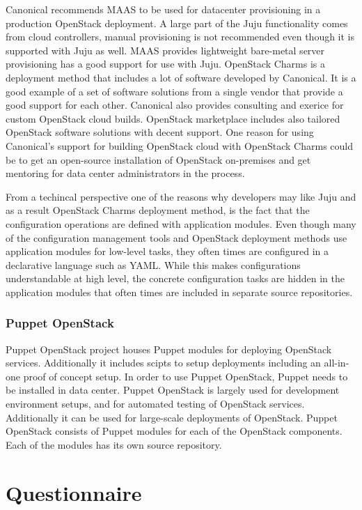 Canonical recommends MAAS to be used for datacenter provisioning in a
production OpenStack deployment. A large part of the Juju functionality comes
from cloud controllers, manual provisioning is not recommended even though it
is supported with Juju as well. MAAS provides lightweight bare-metal server
provisioning has a good support for use with Juju. OpenStack Charms is a
deployment method that includes a lot of software developed by Canonical. It is
a good example of a set of software solutions from a single vendor that provide
a good support for each other. Canonical also provides consulting and exerice
for custom OpenStack cloud builds.  OpenStack marketplace includes also
tailored OpenStack software solutions with decent support. One reason for using
Canonical's support for building OpenStack cloud with OpenStack Charms could be
to get an open-source installation of OpenStack on-premises and get mentoring
for data center administrators in the process.

From a techincal perspective one of the reasons why developers may like Juju
and as a result OpenStack Charms deployment method, is the fact that the
configuration operations are defined with application modules. Even though many
of the configuration management tools and OpenStack deployment methods use
application modules for low-level tasks, they often times are configured in a
declarative language such as YAML. While this makes configurations
understandable at high level, the concrete configuration tasks are hidden in
the application modules that often times are included in separate source
repositories.

\subsection{Puppet OpenStack}

Puppet OpenStack project houses Puppet \cite{puppet-deployment-guide} modules
for deploying OpenStack services. Additionally it includes scipts to setup
deployments including an all-in-one proof of concept setup. In order to use
Puppet OpenStack, Puppet needs to be installed in data center. Puppet OpenStack
is largely used for development environment setups, and for automated testing
of OpenStack services. Additionally it can be used for large-scale deployments
of OpenStack. Puppet OpenStack consists of Puppet modules for each of the
OpenStack components. Each of the modules has its own source repository.

\chapter{Questionnaire} \label{questionnaire}

